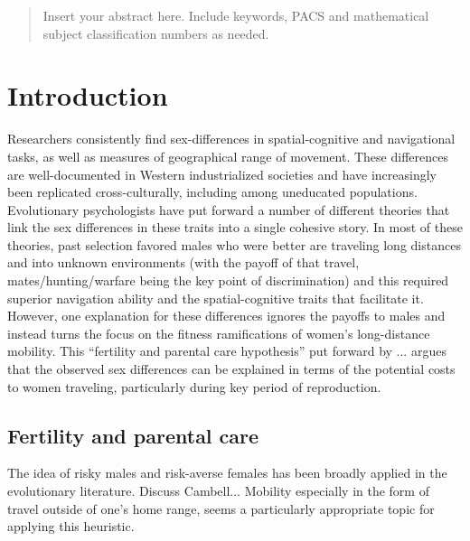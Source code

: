 \date{Received: date / Accepted: date}


\maketitle

\begin{abstract}
Insert your abstract here. Include keywords, PACS and mathematical
subject classification numbers as needed.
\end{abstract}

\section{Introduction}
\label{sec:1}
Researchers consistently find sex-differences in spatial-cognitive and navigational tasks, as well as measures of geographical range of movement.  These differences are well-documented in Western industrialized societies and have increasingly been replicated cross-culturally, including among uneducated populations.  Evolutionary psychologists have put forward a number of different theories that link the sex differences in these traits into a single cohesive story.  In most of these theories, past selection favored males who were better are traveling long distances and into unknown environments (with the payoff of that travel, mates/hunting/warfare being the key point of discrimination) and this required superior navigation ability and the spatial-cognitive traits that facilitate it.  However, one explanation for these differences ignores the payoffs to males and instead turns the focus on the fitness ramifications of women's long-distance mobility.  This ``fertility and parental care hypothesis'' put forward by ... argues that the observed sex differences can be explained in terms of the potential costs to women traveling, particularly during key period of reproduction.

	\subsection{Fertility and parental care}
	\label{sec:1.1}
The idea of risky males and risk-averse females has been broadly applied in the evolutionary literature.  Discuss Cambell... Mobility especially in the form of travel outside of one's home range, seems a particularly appropriate topic for applying this heuristic.  

